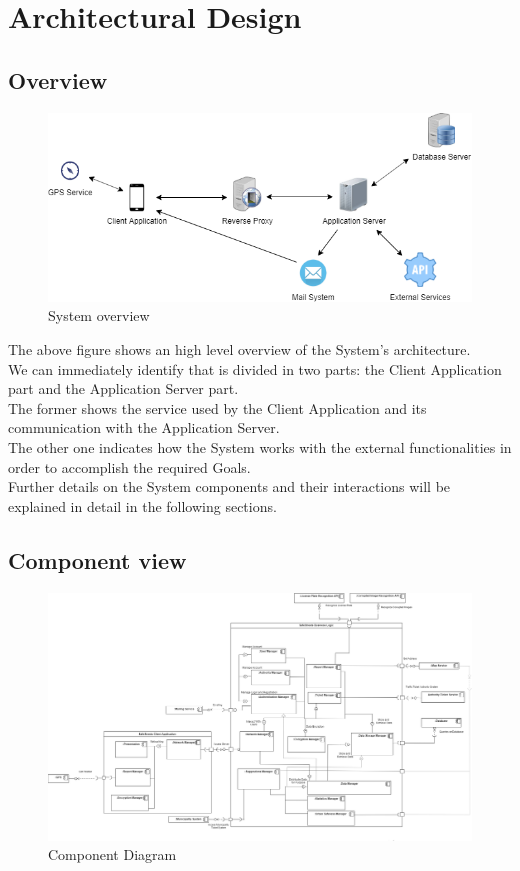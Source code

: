 \section{Architectural Design}

\subsection{Overview}
\begin{figure}[H]
          \includegraphics[scale=0.54,left]{Images/overview.png}
        \caption{System overview}
\end{figure}
The above figure shows an high level overview of the System's architecture.\\
We can immediately identify that is divided in two parts: the Client Application part and the Application Server part.\\
The former shows the service used by the Client Application and its communication with the Application Server.\\
The other one indicates how the System works with the external functionalities in order to accomplish the required Goals.\\
Further details on the System components and their interactions will be explained in detail in the following sections.

\subsection{Component view}


\begin{figure}[H]
\centering
\advance\leftskip-6cm
          \includegraphics[width=1.5\textwidth,left]{Images/Component_view.png}
        \caption{Component Diagram}
\end{figure}


